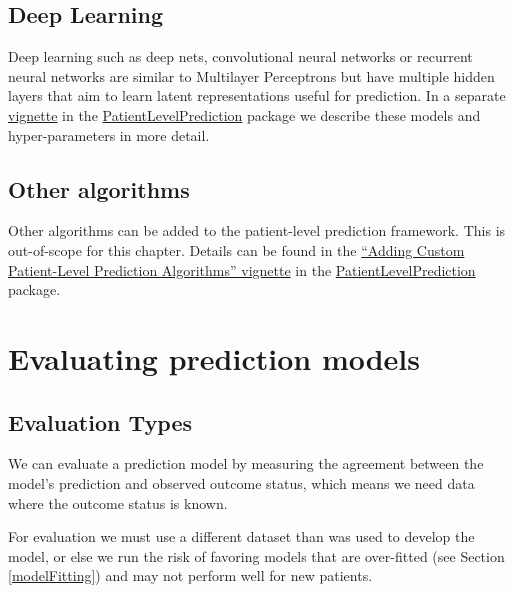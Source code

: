 \documentclass[11pt]{book}
\theoremstyle{definition}
\theoremstyle{definition}
\theoremstyle{definition}
\theoremstyle{remark}
\let\BeginKnitrBlock\begin \let\EndKnitrBlock\end
\begin{document}
\hypertarget{deep-learning}{%
\subsection{Deep Learning}\label{deep-learning}}

Deep learning such as deep nets, convolutional neural networks or recurrent neural networks are similar to Multilayer Perceptrons but have multiple hidden layers that aim to learn latent representations useful for prediction. In a separate \href{https://ohdsi.github.io/PatientLevelPrediction/articles/BuildingDeepLearningModels.html}{vignette} in the \href{https://ohdsi.github.io/PatientLevelPrediction/}{PatientLevelPrediction} package we describe these models and hyper-parameters in more detail.

\hypertarget{other-algorithms}{%
\subsection{Other algorithms}\label{other-algorithms}}

Other algorithms can be added to the patient-level prediction framework. This is out-of-scope for this chapter. Details can be found in the \href{https://ohdsi.github.io/PatientLevelPrediction/articles/AddingCustomAlgorithms.html}{``Adding Custom Patient-Level Prediction Algorithms'' vignette} in the \href{https://ohdsi.github.io/PatientLevelPrediction/}{PatientLevelPrediction} package.

\hypertarget{evaluating-prediction-models}{%
\section{Evaluating prediction models}\label{evaluating-prediction-models}}

\hypertarget{evaluation-types}{%
\subsection{Evaluation Types}\label{evaluation-types}}

We can evaluate a prediction model by measuring the agreement between the model's prediction and observed outcome status, which means we need data where the outcome status is known.

\BeginKnitrBlock{rmdimportant}
For evaluation we must use a different dataset than was used to develop the model, or else we run the risk of favoring models that are over-fitted (see Section \ref{modelFitting}) and may not perform well for new patients.
\EndKnitrBlock{rmdimportant}
\end{document}
